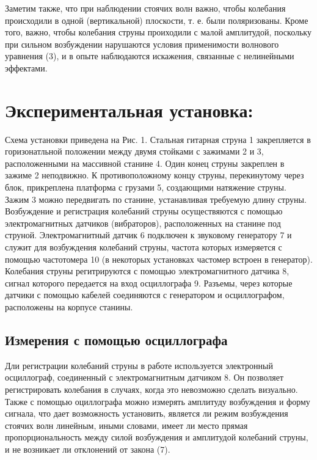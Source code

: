 \documentclass[a4paper,12pt]{article} %
\begin{document}
Заметим также, что при наблюдении стоячих волн важно, чтобы колебания происходили в одной (вертикальной) плоскости, т. е. были поляризованы. Кроме того, важно, чтобы колебания струны проиходили с малой амплитудой, поскольку при сильном возбуждении нарушаются условия применимости волнового уравнения (3), и в опыте наблюдаются искажения, связанные с нелинейными эффектами.
\section{Экспериментальная установка:}
Схема установки приведена на Рис. 1. Стальная гитарная струна 1 закрепляется в горизонатльной положении между двумя стойками с зажимами 2 и 3, расположенными на массивной станине 4. Один конец струны закреплен в зажиме 2 неподвижно. К противоположному концу струны, перекинутому через блок, прикреплена платформа с грузами 5, создающими натяжение струны. Зажим 3 можно передвигать по станине, устанавливая требуемую длину струны. Возбуждение и регистрация колебаний струны осуществяются с помощью электромагнитных датчиков (вибраторов), расположенных на станине под струной. Электромагнитный датчик 6 подключен к звуковому генератору 7 и служит для возбуждения колебаний струны, частота которых измеряется с помощью частотомера 10 (в некоторых установках частомер встроен в генератор). Колебания струны регитрируются с помощью электромагнитного датчика 8, сигнал которого передается на вход осциллографа 9. Разъемы, через которые датчики с помощью кабелей соединяются с генератором и осциллографом, расположены на корпусе станины.
\subsection{Измерения с помощью осциллографа}
Дли регистрации колебаний струны в работе используется электронный осциллограф, соединенный с электромагнитным датчиком 8. Он позволяет регистрировать колебания в случаях, когда это невозможно сделать визуально. Также с помощью оциллографа можно измерять амплитуду возбуждения и форму сигнала, что дает возможность установить, является ли режим возбуждения стоячих волн линейным, иными словами, имеет ли место прямая пропорциональность между силой возбуждения и амплитудой колебаний струны, и не возникает ли отклонений от закона (7).
\end{document}
